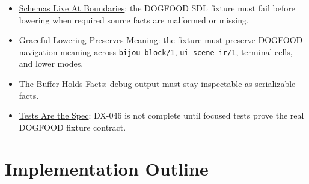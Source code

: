 \begin{itemize}
\tightlist
\item
  \href{https://github.com/flyingrobots/bijou/blob/cbd70612140e7a450d764b3c7be1c6af878b99bc/docs/invariants/schemas-live-at-boundaries.md}{Schemas Live At Boundaries}: the DOGFOOD SDL fixture must fail before lowering when required source facts are malformed or missing.
\item
  \href{https://github.com/flyingrobots/bijou/blob/cbd70612140e7a450d764b3c7be1c6af878b99bc/docs/invariants/graceful-lowering-preserves-meaning.md}{Graceful Lowering Preserves Meaning}: the fixture must preserve DOGFOOD navigation meaning across \texttt{b\allowbreak{}i\allowbreak{}j\allowbreak{}o\allowbreak{}u\allowbreak{}-\allowbreak{}b\allowbreak{}l\allowbreak{}o\allowbreak{}c\allowbreak{}k\allowbreak{}/\allowbreak{}1}, \texttt{u\allowbreak{}i\allowbreak{}-\allowbreak{}s\allowbreak{}c\allowbreak{}e\allowbreak{}n\allowbreak{}e\allowbreak{}-\allowbreak{}i\allowbreak{}r\allowbreak{}/\allowbreak{}1}, terminal cells, and lower modes.
\item
  \href{https://github.com/flyingrobots/bijou/blob/cbd70612140e7a450d764b3c7be1c6af878b99bc/docs/invariants/buffer-holds-facts.md}{The Buffer Holds Facts}: debug output must stay inspectable as serializable facts.
\item
  \href{https://github.com/flyingrobots/bijou/blob/cbd70612140e7a450d764b3c7be1c6af878b99bc/docs/invariants/tests-are-the-spec.md}{Tests Are the Spec}: DX-046 is not complete until focused tests prove the real DOGFOOD fixture contract.
\end{itemize}

\section{Implementation Outline}\label{record-142-implementation-outline}

